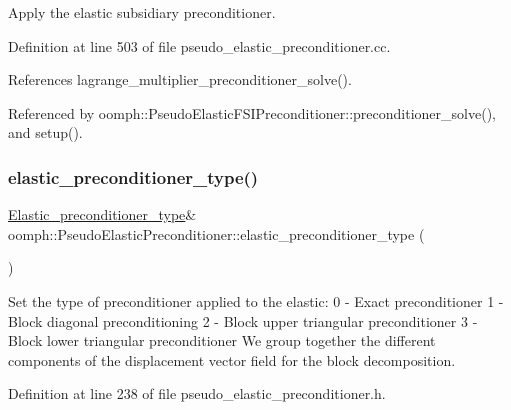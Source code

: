 Apply the elastic subsidiary preconditioner. 



Definition at line 503 of file pseudo\+\_\+elastic\+\_\+preconditioner.\+cc.



References lagrange\+\_\+multiplier\+\_\+preconditioner\+\_\+solve().



Referenced by oomph\+::\+Pseudo\+Elastic\+F\+S\+I\+Preconditioner\+::preconditioner\+\_\+solve(), and setup().

\mbox{\label{classoomph_1_1PseudoElasticPreconditioner_a1bae7b43cffbfbce246b736d9e70f908}} 
\subsubsection{\texorpdfstring{elastic\+\_\+preconditioner\+\_\+type()}{elastic\_preconditioner\_type()}}
{\footnotesize\ttfamily \hyperlink{classoomph_1_1PseudoElasticPreconditioner_acde733e1a111a961d1e714add4e8015d}{Elastic\+\_\+preconditioner\+\_\+type}\& oomph\+::\+Pseudo\+Elastic\+Preconditioner\+::elastic\+\_\+preconditioner\+\_\+type (\begin{DoxyParamCaption}{ }\end{DoxyParamCaption})\hspace{0.3cm}{\ttfamily [inline]}}



Set the type of preconditioner applied to the elastic\+: 0 -\/ Exact preconditioner 1 -\/ Block diagonal preconditioning 2 -\/ Block upper triangular preconditioner 3 -\/ Block lower triangular preconditioner We group together the different components of the displacement vector field for the block decomposition. 



Definition at line 238 of file pseudo\+\_\+elastic\+\_\+preconditioner.\+h.

\mbox{\label{classoomph_1_1PseudoElasticPreconditioner_a917caf20e03fc8bdb45336206ce5365e}} 
